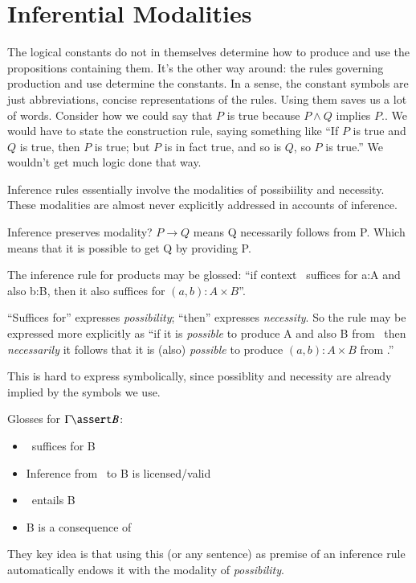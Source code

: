 \section{Inferential Modalities}\label{sec:modalities}

The logical constants do not in themselves determine how to produce
and use the propositions containing them. It's the other way around:
the rules governing production and use determine the constants. In a
sense, the constant symbols are just abbreviations, concise
representations of the rules. Using them saves us a lot of words.
Consider how we could say that \(P\) is true because \(P\land Q\)
implies \(P\).. We would have to state the construction rule, saying
something like ``If \(P\) is true and \(Q\) is true, then \(P\) is
true; but \(P\) is in fact true, and so is \(Q\), so \(P\) is true.''
We wouldn't get much logic done that way.

Inference rules essentially involve the modalities of possibiility and
necessity. These modalities are almost never explicitly addressed in
accounts of inference.

Inference preserves modality? \(P\rightarrow Q\) means Q necessarily
follows from P. Which means that it is possible to get Q by
providing P.

The inference rule for products may be glossed: ``if
context \ContextG\ suffices for a:A and also b:B, then it also suffices for \( (a,b):A\times B\)''.

``Suffices for'' expresses \textit{possibility}; ``then'' expresses
\textit{necessity}. So the rule may be expressed more explicitly as
``if it is \textit{possible} to produce A and also B from \Gamma\,
then \textit{necessarily} it follows that it is (also)
\textit{possible} to produce \( (a,b):A\times B \) from \Gamma.''

This is hard to express symbolically, since possiblity and necessity
are already implied by the symbols we use.

Glosses for \(\Gamma\linfer B\):

\begin{itemize}
\item \Gamma\ suffices for B
\item Inference from \Gamma\ to B is licensed/valid
\item \Gamma\ entails B
\item B is a consequence of \Gamma
\end{itemize}

They key idea is that using this (or any sentence) as premise of an
inference rule automatically endows it with the modality of
\textit{possibility}.

